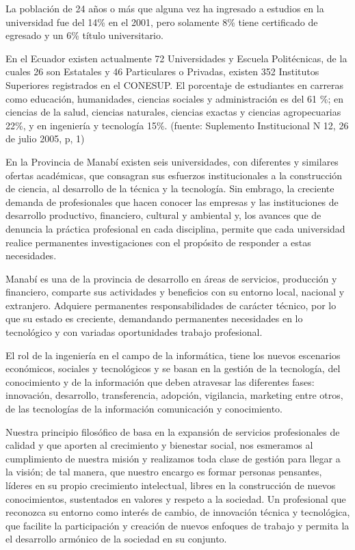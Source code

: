 La población de 24 años o más que alguna vez ha ingresado a estudios en la universidad fue del 14\%  en el 2001, pero solamente 8\% tiene certificado de egresado y un 6\% título universitario.

En el Ecuador existen  actualmente 72 Universidades  y Escuela Politécnicas, de la cuales 26 son Estatales y 46 Particulares  o Privadas, existen 352 Institutos Superiores registrados en el CONESUP. El porcentaje de estudiantes en carreras como educación, humanidades, ciencias sociales y administración es del 61 \%; en ciencias de la salud, ciencias naturales, ciencias exactas y ciencias agropecuarias 22\%, y en ingeniería y tecnología 15\%. (fuente: Suplemento Institucional N 12, 26 de julio 2005, p, 1)

En la Provincia de Manabí existen seis universidades, con diferentes  y similares ofertas académicas, que consagran sus esfuerzos institucionales a la construcción de ciencia, al desarrollo de la técnica y la tecnología. Sin embrago, la creciente demanda de  profesionales que hacen conocer las empresas y las instituciones de desarrollo productivo, financiero, cultural y ambiental y, los avances que de denuncia la práctica profesional en cada disciplina, permite que cada universidad realice permanentes investigaciones  con el propósito  de responder a estas necesidades. 

Manabí es una de la provincia de desarrollo  en áreas de servicios, producción y financiero, comparte sus actividades y beneficios  con su entorno local, nacional y extranjero. Adquiere permanentes responsabilidades de carácter técnico, por lo que su estado es creciente, demandando permanentes necesidades en lo tecnológico y con variadas oportunidades trabajo profesional.

El rol de la ingeniería en el campo de la informática, tiene los nuevos escenarios económicos, sociales y tecnológicos y se basan en la gestión de la tecnología, del conocimiento y de la información que deben atravesar las diferentes fases: innovación, desarrollo, transferencia, adopción, vigilancia, marketing entre otros, de las tecnologías de la información comunicación y conocimiento.

Nuestra principio filosófico de basa en la expansión de servicios  profesionales de calidad y que aporten al   crecimiento y bienestar  social, nos esmeramos al cumplimiento de nuestra misión y realizamos toda clase de gestión para llegar a la visión; de tal manera, que nuestro encargo es formar personas pensantes, líderes  en su  propio crecimiento intelectual, libres en la construcción de nuevos conocimientos, sustentados en valores y respeto a la sociedad. Un profesional que reconozca su  entorno como interés de cambio, de innovación técnica y tecnológica, que facilite la participación y creación  de nuevos enfoques de trabajo y permita la el desarrollo armónico de la sociedad en su conjunto.

